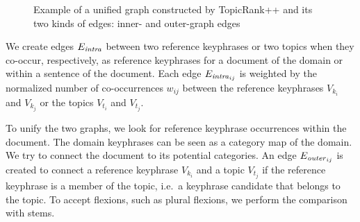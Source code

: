 \begin{figure*}
      \caption{Example of a unified graph constructed by TopicRank++ and its two
               kinds of edges: inner- and outer-graph edges
               \label{fig:topicrankpp_graph}}
    \end{figure*}

    We create edges $E_\textnormal{\textit{intra}}$ between two reference
    keyphrases or two topics when they co-occur, respectively, as reference
    keyphrases for a document of the domain or within a sentence of the
    document. Each edge $E_{\textnormal{\textit{intra}}_{ij}}$ is weighted by
    the normalized number of co-occurrences $w_{ij}$ between the reference
    keyphrases $V_{k_i}$ and $V_{k_j}$ or the topics $V_{t_i}$ and $V_{t_j}$.

    To unify the two graphs, we look for reference keyphrase occurrences within
    the document. The domain keyphrases can be seen as a category map of the
    domain. We try to connect the document to its potential categories. An edge
    $E_{\textnormal{\textit{outer}}_{ij}}$ is created to connect a reference
    keyphrase $V_{k_i}$ and a topic $V_{t_j}$ if the reference keyphrase is a
    member of the topic, i.e.~a keyphrase candidate that belongs to the topic.
    To accept flexions, such as plural flexions, we perform the comparison with
    stems.

